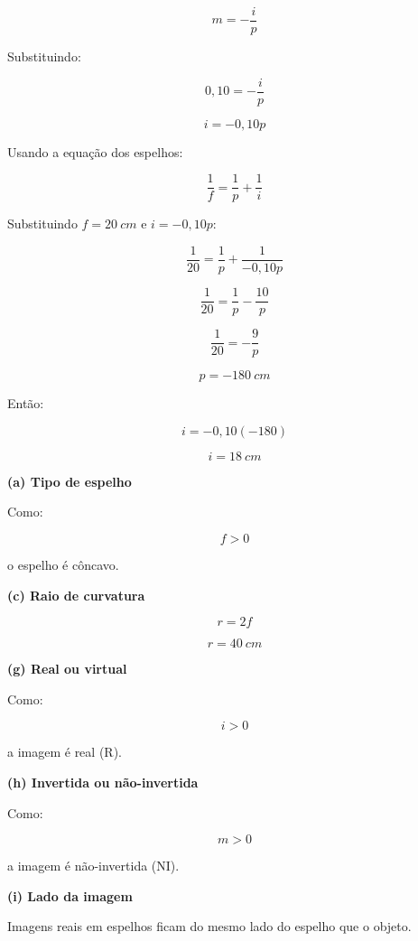 \documentclass[12pt,a4paper]{article}
\begin{document}
\[
m=-\frac{i}{p}
\]

Substituindo:

\[
0,10=-\frac{i}{p}
\]

\[
i=-0,10p
\]

\vspace{0.5cm}

Usando a equação dos espelhos:

\[
\frac{1}{f}
=
\frac{1}{p}
+
\frac{1}{i}
\]

Substituindo \(f=20\ cm\) e \(i=-0,10p\):

\[
\frac{1}{20}
=
\frac{1}{p}
+
\frac{1}{-0,10p}
\]

\[
\frac{1}{20}
=
\frac{1}{p}
-
\frac{10}{p}
\]

\[
\frac{1}{20}
=
-\frac{9}{p}
\]

\[
p=-180\ cm
\]

Então:

\[
i=-0,10(-180)
\]

\[
i=18\ cm
\]

\vspace{0.5cm}

\textbf{(a) Tipo de espelho}

Como:

\[
f>0
\]

o espelho é côncavo.

\vspace{0.5cm}

\textbf{(c) Raio de curvatura}

\[
r=2f
\]

\[
r=40\ cm
\]

\vspace{0.5cm}

\textbf{(g) Real ou virtual}

Como:

\[
i>0
\]

a imagem é real (R).

\vspace{0.5cm}

\textbf{(h) Invertida ou não-invertida}

Como:

\[
m>0
\]

a imagem é não-invertida (NI).

\vspace{0.5cm}

\textbf{(i) Lado da imagem}

Imagens reais em espelhos ficam do mesmo lado do espelho que o objeto.
\end{document}
